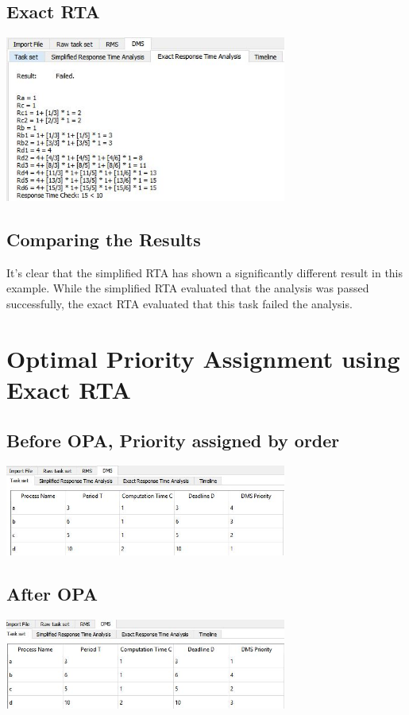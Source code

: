 \documentclass[a4paper]{article}
\begin{document}
\subsection{Exact RTA}
\begin{center}
	\includegraphics[width=350px]{img3.JPG}
\end{center}

\subsection{Comparing the Results}
It's clear that the simplified RTA has shown a significantly different result in this example. While the simplified RTA evaluated that the analysis was passed successfully, the exact RTA evaluated that this task failed the analysis.

\section{Optimal Priority Assignment using Exact RTA}
\subsection{Before OPA, Priority assigned by order}
\begin{center}
	\includegraphics[width=350px]{img5.JPG}
\end{center}
\subsection{After OPA}
\begin{center}
	\includegraphics[width=350px]{img6.JPG}
\end{center}
\end{document}
